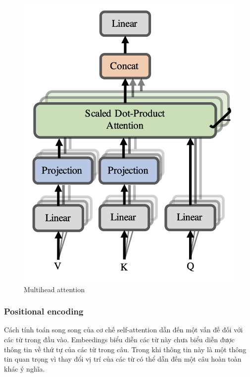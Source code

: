 \begin{figure}[H]
    \begin{center}
        \includegraphics[scale=0.5]{images/multihead-attention}
        \caption{Multihead attention}
        \label{fig:multihead-attention}
    \end{center}
\end{figure}



\subsubsection{Positional encoding}

Cách tính toán song song của cơ chế self-attention dẫn đến một vấn đề đối với các từ trong đầu vào. Embeedings biểu diễn các từ này chưa biểu diễn được thông tin về thứ tự của các từ trong câu. Trong khi thông tin này là một thông tin quan trọng vì thay đổi vị trí của các từ có thể dẫn đến một câu hoàn toàn khác ý nghĩa.

